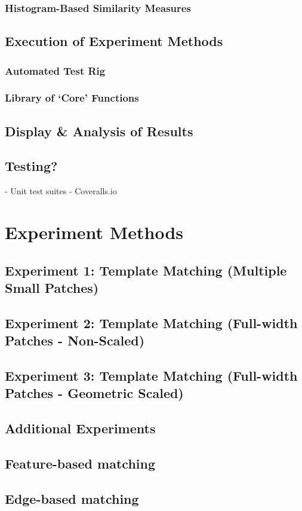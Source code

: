 \subsubsection{Histogram-Based Similarity Measures}

\subsection{Execution of Experiment Methods}

\subsubsection{Automated Test Rig}

\subsubsection{Library of `Core' Functions}

\subsection{Display \& Analysis of Results}

\subsection{Testing?}

- Unit test suites
- Coveralls.io

\section{Experiment Methods}

\subsection{Experiment 1: Template Matching (Multiple Small Patches)}
\label{ex1}
\subsection{Experiment 2: Template Matching (Full-width Patches - Non-Scaled)}
\subsection{Experiment 3: Template Matching (Full-width Patches - Geometric Scaled)}
\label{tm-scaled}

\subsection{Additional Experiments}

\subsection{Feature-based matching}
\subsection{Edge-based matching}




